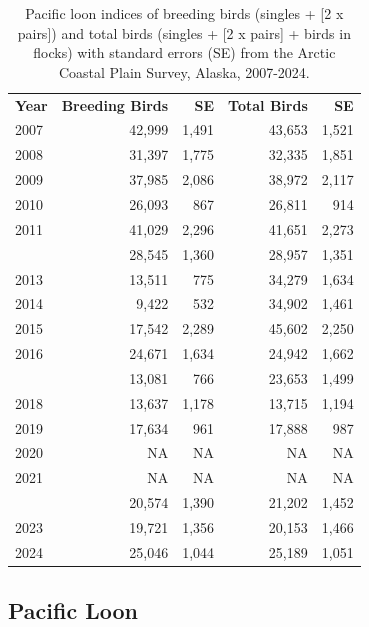 \documentclass[
]{article}
\begin{document}
\begin{longtable}[t]{lrrrr}

\caption{\label{tbl-PALO}Pacific loon indices of breeding birds (singles
+ {[}2 x pairs{]}) and total birds (singles + {[}2 x pairs{]} + birds in
flocks) with standard errors (SE) from the Arctic Coastal Plain Survey,
Alaska, 2007-2024.}

\tabularnewline

\\
\toprule
\textbf{Year} & \textbf{Breeding Birds} & \textbf{SE} & \textbf{Total Birds} & \textbf{SE}\\
\midrule
2007 & 42,999 & 1,491 & 43,653 & 1,521\\
2008 & 31,397 & 1,775 & 32,335 & 1,851\\
2009 & 37,985 & 2,086 & 38,972 & 2,117\\
2010 & 26,093 & 867 & 26,811 & 914\\
2011 & 41,029 & 2,296 & 41,651 & 2,273\\
\addlinespace
2012 & 28,545 & 1,360 & 28,957 & 1,351\\
2013 & 13,511 & 775 & 34,279 & 1,634\\
2014 & 9,422 & 532 & 34,902 & 1,461\\
2015 & 17,542 & 2,289 & 45,602 & 2,250\\
2016 & 24,671 & 1,634 & 24,942 & 1,662\\
\addlinespace
2017 & 13,081 & 766 & 23,653 & 1,499\\
2018 & 13,637 & 1,178 & 13,715 & 1,194\\
2019 & 17,634 & 961 & 17,888 & 987\\
2020 & NA & NA & NA & NA\\
2021 & NA & NA & NA & NA\\
\addlinespace
2022 & 20,574 & 1,390 & 21,202 & 1,452\\
2023 & 19,721 & 1,356 & 20,153 & 1,466\\
2024 & 25,046 & 1,044 & 25,189 & 1,051\\
\bottomrule

\end{longtable}

\endgroup{}

\newpage{}

\subsection*{Pacific Loon}\label{pacific-loon-2}
\end{document}
